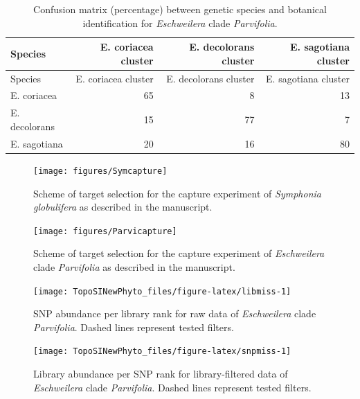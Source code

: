 \documentclass[12pt,]{article}
\begin{document}
\newpage

\begin{longtable}[]{@{}lrrr@{}}
\caption{\label{tab:kmeansConfusion}Confusion matrix (percentage) between genetic species and botanical identification for \emph{Eschweilera} clade \emph{Parvifolia}.}\tabularnewline
\toprule
Species & E. coriacea cluster & E. decolorans cluster & E. sagotiana cluster\tabularnewline
\midrule
\endfirsthead
\toprule
Species & E. coriacea cluster & E. decolorans cluster & E. sagotiana cluster\tabularnewline
\midrule
\endhead
E. coriacea & 65 & 8 & 13\tabularnewline
E. decolorans & 15 & 77 & 7\tabularnewline
E. sagotiana & 20 & 16 & 80\tabularnewline
\bottomrule
\end{longtable}

\newpage

\begin{figure}[H]

{\centering \texttt{[image: figures/Symcapture]} 

}

\caption{Scheme of target selection for the capture experiment of \emph{Symphonia globulifera} as described in the manuscript.}\label{fig:symcapture}
\end{figure}

\newpage

\begin{figure}[H]

{\centering \texttt{[image: figures/Parvicapture]} 

}

\caption{Scheme of target selection for the capture experiment of \emph{Eschweilera} clade \emph{Parvifolia} as described in the manuscript.}\label{fig:parvicapture}
\end{figure}

\newpage

\begin{figure}[H]

{\centering \texttt{[image: TopoSINewPhyto\_files/figure-latex/libmiss-1]} 

}

\caption{SNP abundance per library rank for raw data of \emph{Eschweilera} clade \emph{Parvifolia}. Dashed lines represent tested filters.}\label{fig:libmiss}
\end{figure}

\newpage

\begin{figure}[H]

{\centering \texttt{[image: TopoSINewPhyto\_files/figure-latex/snpmiss-1]} 

}

\caption{Library abundance per SNP rank for library-filtered data of \emph{Eschweilera} clade \emph{Parvifolia}. Dashed lines represent tested filters.}\label{fig:snpmiss}
\end{figure}
\end{document}
